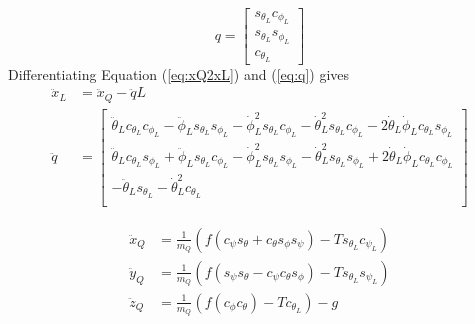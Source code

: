 \begin{equation}\label{eq:q}
q=\begin{bmatrix}
s_{\theta_L}c_{\phi_L}\\
s_{\theta_L}s_{\phi_L}\\
c_{\theta_L}
\end{bmatrix}
\end{equation}  
Differentiating Equation (\ref{eq:xQ2xL}) and (\ref{eq:q}) gives
\begin{equation}\label{key}
\begin{aligned}
\ddot{x}_L&=\ddot{x}_Q-\ddot{q}L\\
\ddot{q}&=\begin{bmatrix}
\ddot{\theta}_Lc_{\theta_L}c_{\phi_L}-\ddot{\phi}_Ls_{\theta_L}s_{\phi_L}-\dot{\phi}_L^2s_{\theta_L}c_{\phi_L}-\dot{\theta}_L^2s_{\theta_L}c_{\phi_L}-2\dot{\theta}_L\dot{\phi}_Lc_{\theta_L}s_{\phi_L}\\
\ddot{\theta}_Lc_{\theta_L}s_{\phi_L}+\ddot{\phi}_Ls_{\theta_L}c_{\phi_L}-\dot{\phi}_L^2s_{\theta_L}s_{\phi_L}-\dot{\theta}_L^2s_{\theta_L}s_{\phi_L}+2\dot{\theta}_L\dot{\phi}_Lc_{\theta_L}c_{\phi_L}\\
-\ddot{\theta}_Ls_{\theta_L}-\dot{\theta}_L^2 c_{\theta_L}\\
\end{bmatrix}
\end{aligned}
\end{equation}

\begin{equation}\label{key}
\begin{aligned}
\ddot{x}_Q&=\frac{1}{m_Q}(f(c_{\psi}s_{\theta}+c_{\theta}s_{\phi}s_{\psi})-Ts_{\theta_L}c_{\psi_L})\\
\ddot{y}_Q&=\frac{1}{m_Q}(f(s_{\psi}s_{\theta}-c_{\psi}c_{\theta}s_{\phi})-Ts_{\theta_L}s_{\psi_L})\\
\ddot{z}_Q&=\frac{1}{m_Q}(f(c_{\phi}c_{\theta})-Tc_{\theta_L})-g\\
\end{aligned}
\end{equation}

